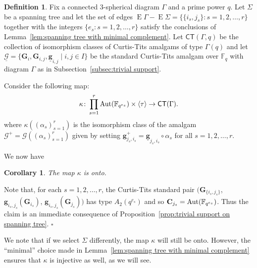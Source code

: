 \documentclass[12pt]{amsart}
\newtheorem{corollary}[theorem]{Corollary}
\theoremstyle{definition}
\newtheorem{definition}[theorem]{Definition}
\newcommand{\bpf}{\noindent{\bf Proof}\hspace{7pt}}
\newcommand{\epf}{\qed}
\newcommand{\bco}{\begin{corollary}}
\newcommand{\eco}{\end{corollary}}
\newcommand{\bde}{\begin{definition}}
\newcommand{\ede}{\end{definition}}
\newcommand{\ul}{\underline}
\newcommand{\sCT}{{\mathsf{CT}}}
\newcommand{\Aut}{\mathop{\rm Aut}\nolimits}
\newcommand{\FF}{{\mathbb F}}
\newcommand{\after}{\mathbin{ \circ }}
\newcommand{\trin}{\tau}
\renewcommand{\qed}{\hfill $\square$}
\newcommand{\amgrpC}{{\mathbf{C}}}
\newcommand{\amgrpG}{{\mathbf{G}}}
\newcommand{\amg}{{\mathbf g}}
\newcommand{\famg}{\ul{\mathbf g}}
\newcommand{\famG}{\ul{\mathscr{G}}}
\newcommand{\amG}{{\mathscr{G}}}
\DeclareMathOperator{\edg}{E}
\newcommand{\liediag}{\Gamma}
\begin{document}
\bde\label{dfn:CT the map kappa}
Fix a connected $3$-spherical diagram $\liediag$ and a prime power $q$. Let  $\Sigma$  be a spanning tree and let the set of edges $\edg\liediag-\edg\Sigma=\{\{i_s,j_s\}\colon s=1,2,\ldots,r\}$ together with the integers $\{e_s\colon s=1,2,\ldots,r\}$ satisfy the conclusions of Lemma~\ref{lem:spanning tree with minimal complement}.
Let $\sCT(\liediag,q)$ be the collection of isomorphism classes of  Curtis-Tits amalgams of type $\liediag(q)$ and let $\famG=\{\amgrpG_i,\amgrpG_{i,j},\famg_{i,j}\mid i,j\in I\}$ be the standard Curtis-Tits amalgam over $\FF_q$ with diagram $\liediag$ as in Subsection~\ref{subsec:trivial support}.

Consider the following map:
\begin{align*}
\kappa\colon\prod_{s=1}^r \Aut(\FF_{q^{e_s}})\times \langle\trin\rangle\to \sCT(\liediag).
\end{align*}
where $\kappa((\alpha_s)_{s=1}^r)$ is the isomorphism class of the amalgam $\amG^+=\amG((\alpha_s)_{s=1}^r)$ given by setting $\amg^+_{j_s,i_s}=\famg_{j_s,i_s}\after \alpha_s$ for all $s=1,2,\ldots,r$.
\ede

We now have 
\bco\label{cor:CT kappa is onto}
The map $\kappa$ is onto.
\eco
\bpf
Note that, for each $s=1,2,\ldots,r$, the Curtis-Tits standard pair $(\amgrpG_{\{i_s,j_s\}}$, $\amg_{i_s,j_s}(\amgrpG_{i_s})$, $\amg_{i_s,j_s}(\amgrpG_{j_s}))$ has type $A_2(q^{e_s})$ and so $\amgrpC_{j_s}=\Aut(\FF_{q^{e_s}})$.  Thus the claim is an immediate consequence of Proposition~\ref{prop:trivial support on spanning tree}.
\epf

\medskip
We note that if we select $\Sigma$ differently, the map $\kappa$ will still be onto. However, the ``minimal'' choice made in Lemma~\ref{lem:spanning tree with minimal complement} ensures that $\kappa$ is injective as well, as we will see.
\end{document}
